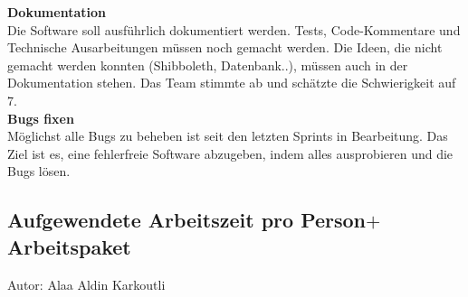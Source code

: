 \textbf{Dokumentation}\\
Die Software soll ausführlich dokumentiert werden. Tests, Code-Kommentare und 
Technische Ausarbeitungen müssen noch gemacht werden. Die Ideen, die nicht gemacht werden konnten (Shibboleth, Datenbank..), müssen
auch in der Dokumentation stehen. 
Das Team stimmte ab und schätzte die Schwierigkeit auf 7.\\

\textbf{Bugs fixen}\\
Möglichst alle Bugs zu beheben ist seit den letzten Sprints in Bearbeitung. Das Ziel ist es,
eine fehlerfreie Software abzugeben, indem alles ausprobieren und die Bugs lösen.

\subsection{Aufgewendete Arbeitszeit pro Person$+$Arbeitspaket}
{\small Autor: Alaa Aldin Karkoutli}


